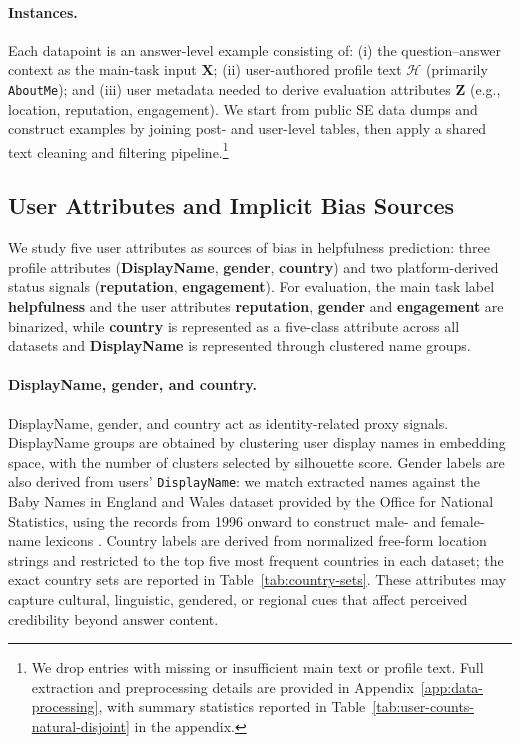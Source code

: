 \documentclass[11pt]{article}
\newcommand{\rv}[1]{\mathbf{#1}}
\begin{document}
\paragraph{Instances.}
Each datapoint is an answer-level example consisting of: (i) the question--answer context as the main-task input $\rv{X}$; (ii) user-authored profile text $\mathcal{H}$ (primarily \texttt{AboutMe}); and (iii) user metadata needed to derive evaluation attributes $\rv{Z}$ (e.g., location, reputation, engagement). We start from public SE data dumps and construct examples by joining post- and user-level tables, then apply a shared text cleaning and filtering pipeline.\footnote{We drop entries with missing or insufficient main text or profile text. Full extraction and preprocessing details are provided in Appendix~\ref{app:data-processing}, with summary statistics reported in Table~\ref{tab:user-counts-natural-disjoint} in the appendix.}



\subsection{User Attributes and Implicit Bias Sources}
\label{sec:attributes}

We study five user attributes as sources of bias in helpfulness prediction: three  profile attributes (\textbf{DisplayName}, \textbf{gender}, \textbf{country}) and two platform-derived status signals (\textbf{reputation}, \textbf{engagement}). For evaluation, the main task label \textbf{helpfulness} and the user attributes \textbf{reputation}, \textbf{gender} and \textbf{engagement} are binarized, while \textbf{country} is represented as a five-class attribute across all datasets and \textbf{DisplayName} is represented through clustered name groups.





\paragraph{DisplayName, gender, and country.}
DisplayName, gender, and country act as identity-related proxy signals. DisplayName groups are obtained by clustering user display names in embedding space, with the number of clusters selected by silhouette score. Gender labels are also derived from users' \texttt{DisplayName}: we match extracted names against the Baby Names in England and Wales dataset provided by the Office for National Statistics, using the records from 1996 onward to construct male- and female-name lexicons \citep{ons_babynames_2025}. Country labels are derived from normalized free-form location strings and restricted to the top five most frequent countries in each dataset; the exact country sets are reported in Table~\ref{tab:country-sets}. These attributes may capture cultural, linguistic, gendered, or regional cues that affect perceived credibility beyond answer content.
\end{document}

